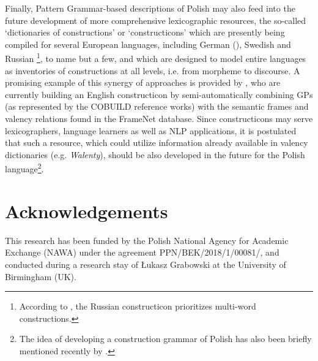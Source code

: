 \documentclass[output=paper]{langscibook}
\begin{document}
Finally, Pattern Grammar-based descriptions of Polish may also feed into the future development of more comprehensive lexicographic resources, the so-called ‘dictionaries of constructions’ or ‘constructicons’ which are presently being compiled for several European languages, including German (\citealt{BoasZiem2018}), Swedish \citep{LyngfeltEtAl2018AtWork} and Russian \citep{JandaEtAl2018}\footnote{According to \citet[165]{JandaEtAl2018}, the Russian constructicon prioritizes multi-word constructions.}, to name but a few, and which are designed to model entire languages as inventories of constructions at all levels, i.e. from morpheme to discourse. A promising example of this synergy of approaches is provided by \citet{PerekPatten2019}, who are currently building an English constructicon by semi-automatically combining GPs (as represented by the COBUILD reference works) with the semantic frames and valency relations found in the FrameNet database. Since constructicons may serve lexicographers, language learners as well as NLP applications, it is postulated that such a resource, which could utilize information already available in valency dictionaries (e.g. \textit{Walenty}), should be also developed in the future for the Polish language\footnote{The idea of developing a construction grammar of Polish has also been briefly mentioned recently by \citet{Wierzbicka-Piotrowska2019}.}.


\section*{Acknowledgements}
This research has been funded by the Polish National Agency for Academic Exchange (NAWA) under the agreement PPN/BEK/2018/1/00081/, and conducted during a research stay of Łukasz Grabowski at the University of Birmingham (UK).

{\sloppy\printbibliography[heading=subbibliography,notkeyword=this]}
\end{document}
